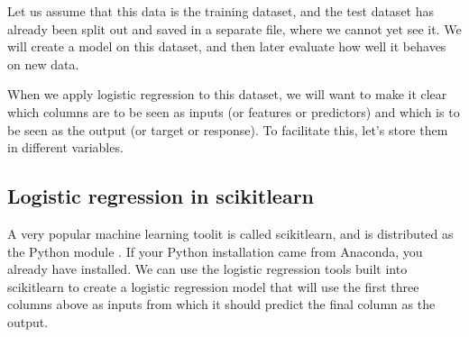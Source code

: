 \documentclass[letterpaper,10pt,english]{sphinxmanual}
\begin{document}
Let us assume that this data is the training dataset, and the test dataset has already been split out and saved in a separate file, where we cannot yet see it.  We will create a model on this dataset, and then later evaluate how well it behaves on new data.

When we apply logistic regression to this dataset, we will want to make it clear which columns are to be seen as inputs (or features or predictors) and which is to be seen as the output (or target or response).  To facilitate this, let’s store them in different variables.

\begin{sphinxVerbatim}[commandchars=\\\{\}]
  \PYG{p}{[}\PYG{p}{[}\PYG{p}{]}\PYG{p}{]}
    \PYG{p}{[}\PYG{p}{]}
\end{sphinxVerbatim}


\subsection{Logistic regression in scikit\sphinxhyphen{}learn}
\label{\detokenize{chapter-17-machine-learning:logistic-regression-in-scikit-learn}}
A very popular machine learning toolit is called scikit\sphinxhyphen{}learn, and is distributed as the Python module .  If your Python installation came from Anaconda, you already have  installed.  We can use the logistic regression tools built into scikit\sphinxhyphen{}learn to create a logistic regression model that will use the first three columns above as inputs from which it should predict the final column as the output.
\end{document}
